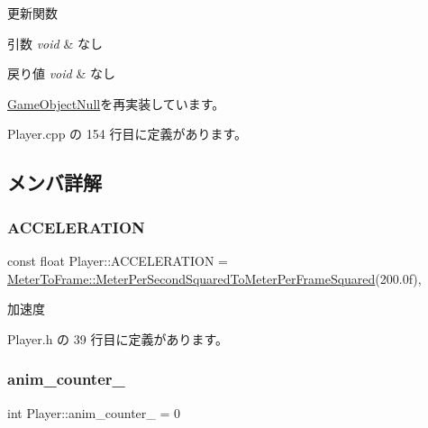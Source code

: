 更新関数 


\begin{DoxyParams}{引数}
{\em void} & なし \\
\hline
\end{DoxyParams}

\begin{DoxyRetVals}{戻り値}
{\em void} & なし \\
\hline
\end{DoxyRetVals}


\mbox{\hyperlink{class_game_object_null_aeeb51b7e7aa41fd0b16f8f7c016bdb55}{Game\+Object\+Null}}を再実装しています。



 Player.\+cpp の 154 行目に定義があります。



\subsection{メンバ詳解}
\mbox{\label{class_player_a93f160503f5e15ca8d9675b5d3d14706}} 
\subsubsection{\texorpdfstring{A\+C\+C\+E\+L\+E\+R\+A\+T\+I\+ON}{ACCELERATION}}
{\footnotesize\ttfamily const float Player\+::\+A\+C\+C\+E\+L\+E\+R\+A\+T\+I\+ON = \mbox{\hyperlink{class_meter_to_frame_ac3292be31b35e97027a65b4c74763ebe}{Meter\+To\+Frame\+::\+Meter\+Per\+Second\+Squared\+To\+Meter\+Per\+Frame\+Squared}}(200.\+0f)\hspace{0.3cm}{\ttfamily [static]}, {\ttfamily [private]}}



加速度 



 Player.\+h の 39 行目に定義があります。

\mbox{\label{class_player_afe5d702e0d5f909d5c562df8a0e6cd9f}} 
\subsubsection{\texorpdfstring{anim\+\_\+counter\+\_\+}{anim\_counter\_}}
{\footnotesize\ttfamily int Player\+::anim\+\_\+counter\+\_\+ = 0\hspace{0.3cm}{\ttfamily [private]}}



